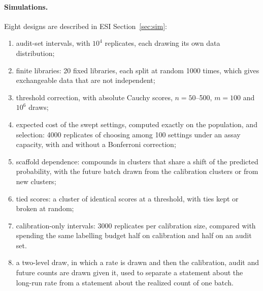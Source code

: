 \documentclass[10pt]{article}
\begin{document}
\paragraph{Simulations.} Eight designs are described in ESI Section~\ref{sec:sim}:
\begin{enumerate}
\item audit-set intervals, with $10^4$ replicates, each drawing its own data distribution;
\item finite libraries: 20 fixed libraries, each split at random 1000 times, which gives exchangeable data that are not independent;
\item threshold correction, with absolute Cauchy scores, $n=50$--500, $m=100$ and $10^6$ draws;
\item expected cost of the swept settings, computed exactly on the population, and selection: 4000 replicates of choosing among 100 settings under an assay capacity, with and without a Bonferroni correction;
\item scaffold dependence: compounds in clusters that share a shift of the predicted probability, with the future batch drawn from the calibration clusters or from new clusters;
\item tied scores: a cluster of identical scores at a threshold, with ties kept or broken at random;
\item calibration-only intervals: 3000 replicates per calibration size, compared with spending the same labelling budget half on calibration and half on an audit set.
\item a two-level draw, in which a rate is drawn and then the calibration, audit and future counts are drawn given it, used to separate a statement about the long-run rate from a statement about the realized count of one batch.
\end{enumerate}
\end{document}
